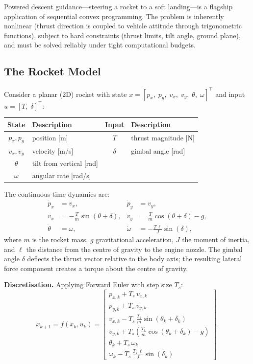 Powered descent guidance---steering a rocket to a soft landing---is a flagship application of sequential convex programming. The problem is inherently nonlinear (thrust direction is coupled to vehicle attitude through trigonometric functions), subject to hard constraints (thrust limits, tilt angle, ground plane), and must be solved reliably under tight computational budgets.

\subsection{The Rocket Model}

Consider a planar (2D) rocket with state $x = [p_x,\; p_y,\; v_x,\; v_y,\; \theta,\; \omega]^\top$ and input $u = [T,\; \delta]^\top$:

\begin{center}
\renewcommand{\arraystretch}{1.2}
\begin{tabular}{cl|cl}
	\toprule
	\textbf{State} & \textbf{Description} & \textbf{Input} & \textbf{Description} \\
	\midrule
	$p_x, p_y$ & position [m] & $T$ & thrust magnitude [N] \\
	$v_x, v_y$ & velocity [m/s] & $\delta$ & gimbal angle [rad] \\
	$\theta$ & tilt from vertical [rad] & & \\
	$\omega$ & angular rate [rad/s] & & \\
	\bottomrule
\end{tabular}
\end{center}

The continuous-time dynamics are:
\begin{align*}
	\dot{p}_x &= v_x, &
	\dot{p}_y &= v_y, \\
	\dot{v}_x &= -\frac{T}{m}\sin(\theta + \delta), &
	\dot{v}_y &= \frac{T}{m}\cos(\theta + \delta) - g, \\
	\dot{\theta} &= \omega, &
	\dot{\omega} &= -\frac{T\,\ell}{J}\sin(\delta),
\end{align*}
where $m$ is the rocket mass, $g$ gravitational acceleration, $J$ the moment of inertia, and $\ell$ the distance from the centre of gravity to the engine nozzle. The gimbal angle $\delta$ deflects the thrust vector relative to the body axis; the resulting lateral force component creates a torque about the centre of gravity.

\textbf{Discretisation.} Applying Forward Euler with step size $T_s$:
\begin{equation*}
	x_{k+1} = f(x_k, u_k) =
	\begin{bmatrix}
		p_{x,k} + T_s\, v_{x,k} \\
		p_{y,k} + T_s\, v_{y,k} \\
		v_{x,k} - T_s\,\frac{T_k}{m}\sin(\theta_k + \delta_k) \\
		v_{y,k} + T_s\!\left(\frac{T_k}{m}\cos(\theta_k + \delta_k) - g\right) \\
		\theta_k + T_s\, \omega_k \\
		\omega_k - T_s\,\frac{T_k\,\ell}{J}\sin(\delta_k)
	\end{bmatrix}.
\end{equation*}

